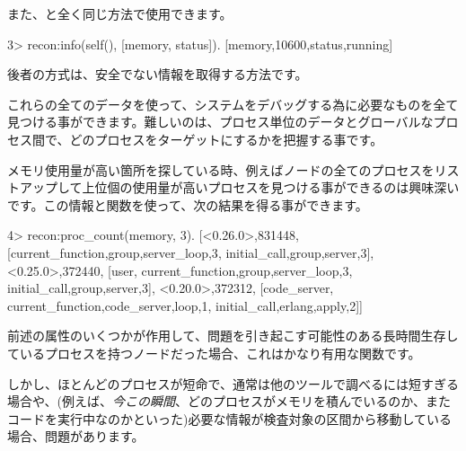 また、と全く同じ方法で使用できます。

\begin{VerbatimEshell}
3> recon:info(self(), [memory, status]).
[{memory,10600},{status,running}]
\end{VerbatimEshell}

後者の方式は、安全でない情報を取得する方法です。

これらの全てのデータを使って、システムをデバッグする為に必要なものを全て見つける事ができます。難しいのは、プロセス単位のデータとグローバルなプロセス間で、どのプロセスをターゲットにするかを把握する事です。

メモリ使用量が高い箇所を探している時、例えばノードの全てのプロセスをリストアップして上位個の使用量が高いプロセスを見つける事ができるのは興味深いです。この情報と関数を使って、次の結果を得る事ができます。

\begin{VerbatimEshell}
4> recon:proc_count(memory, 3).
[{<0.26.0>,831448,
  [{current_function,{group,server_loop,3}},
   {initial_call,{group,server,3}}]},
 {<0.25.0>,372440,
  [user,
   {current_function,{group,server_loop,3}},
   {initial_call,{group,server,3}}]},
 {<0.20.0>,372312,
  [code_server,
   {current_function,{code_server,loop,1}},
   {initial_call,{erlang,apply,2}}]}]
\end{VerbatimEshell}

前述の属性のいくつかが作用して、問題を引き起こす可能性のある長時間生存しているプロセスを持つノードだった場合、これはかなり有用な関数です。

しかし、ほとんどのプロセスが短命で、通常は他のツールで調べるには短すぎる場合や、(例えば、\emph{今この瞬間}、どのプロセスがメモリを積んでいるのか、またコードを実行中なのかといった)必要な情報が検査対象の区間から移動している場合、問題があります。

